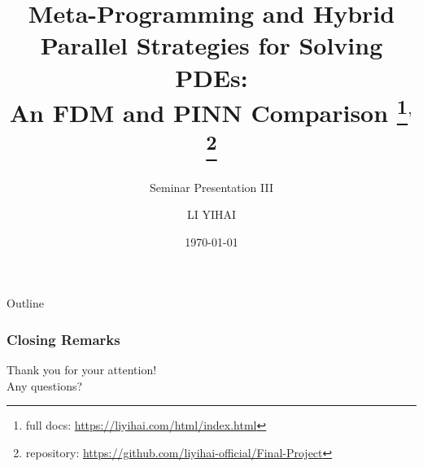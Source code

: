 \documentclass{my-Presentation}
\title[An FDM and PINN Comparison]{
  Meta-Programming and Hybrid Parallel Strategies for Solving PDEs: \\An FDM and PINN Comparison
  \footnote{full docs: \url{https://liyihai.com/html/index.html}}$^{,}$
  \footnote{repository: \url{https://github.com/liyihai-official/Final-Project}}
}
\subtitle{Seminar Presentation III}
\author[LI Yihai]{
  \normalsize
  LI YIHAI \\[1ex]
  \vspace*{-.5em}
}
\institute[Mathematics Institute]{
  Student ID: 23345919 \\[1ex]
  Supervision: Michael Peardon
}
\date{\today \vspace*{-1em}}
\begin{document}
\begin{frame}
  \titlepage
\end{frame}

\begin{frame}{Outline}
  \begin{multicols}{2}
    \tableofcontents
  \end{multicols}
\end{frame}










  




\begin{frame}
  \frametitle{Closing Remarks}
  \centering
  {\Large Thank you for your attention!}\\
  \vspace{2em}
  {\large Any questions?}
\end{frame}


\end{document}
